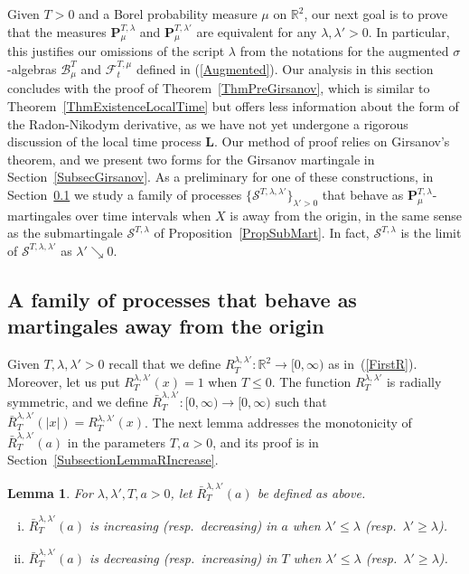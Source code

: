 \documentclass[10pt]{article}
\numberwithin{equation}{section}
\newtheorem{lemma}[theorem]{Lemma}
\theoremstyle{definition}
\newcommand{\R}{{\mathbb R}}
\begin{document}
Given $T>0$ and a  Borel probability measure $\mu$ on $\R^2$, our next goal is to prove that the measures $\mathbf{P}^{T,\lambda}_{\mu}$ and $\mathbf{P}^{T,\lambda'}_{\mu}$ are equivalent for any $\lambda,\lambda' >0$. In particular, this justifies our omissions of the script $\lambda$ from the notations for the augmented $\sigma$-algebras $\mathscr{B}^T_{\mu}$ and $\mathscr{F}^{T,\mu}_t$ defined in (\ref{Augmented}). Our analysis in this section concludes with the proof of Theorem~\ref{ThmPreGirsanov}, which is similar to Theorem~\ref{ThmExistenceLocalTime} but offers less information about the form of the Radon-Nikodym derivative, as we have not yet undergone  a  rigorous discussion of the local time process $\mathbf{L}$. Our method of proof relies on Girsanov's theorem, and we present two forms for  the Girsanov martingale in Section~\ref{SubsecGirsanov}.  As a preliminary for one of these constructions, in Section~\ref{SubsectMartFamily} we study a family of processes $\{\mathcal{S}^{T,\lambda,\lambda'}\}_{\lambda'>0  }$ that behave as $\mathbf{P}^{T,\lambda}_{\mu}$-martingales  over time intervals when $X$ is away from the origin, in the same sense as the submartingale $\mathcal{S}^{T,\lambda}$ of Proposition~\ref{PropSubMart}.  In fact, $\mathcal{S}^{T,\lambda}$ is the limit of $\mathcal{S}^{T,\lambda,\lambda'}$ as $\lambda'\searrow 0$. 





\subsection{A family of processes that behave as martingales away from the origin}\label{SubsectMartFamily}

 Given $T,\lambda,\lambda'>0$ recall that we define $R^{\lambda,\lambda'}_{T}:\R^2\rightarrow [0,\infty)$ as in~(\ref{FirstR}).
Moreover, let us put $R^{\lambda,\lambda'}_{T}(x)=1$ when $T\leq 0$.  The function $R^{\lambda,\lambda'}_{T}$ is radially symmetric, and we define $ \bar{R}^{\lambda,\lambda'}_{T}: [0,\infty)\rightarrow [0,\infty) $ such that $\bar{R}^{\lambda,\lambda'}_{T}(|x|)= R^{\lambda,\lambda'}_{T}(x) $.  The next lemma addresses the monotonicity of $\bar{R}^{\lambda,\lambda'}_{T}(a)$ in the parameters $T,a>0$, and its  proof  is in Section~\ref{SubsectionLemmaRIncrease}.
\begin{lemma}\label{LemmaRIncrease} For $\lambda,\lambda',T,a>0$, let $\bar{R}^{\lambda,\lambda'}_{T}(a)$ be defined as above.
\begin{enumerate}[(i)]

    \item $\bar{R}^{\lambda,\lambda'}_{T}(a)$ is  increasing (resp.\ decreasing) in $a$ when $\lambda'\leq \lambda$ (resp.\ $\lambda'\geq \lambda$).

     \item $ \bar{R}^{\lambda,\lambda'}_{T}(a)$   is decreasing (resp.\ increasing) in $T$ when $\lambda'\leq \lambda$ (resp.\ $\lambda'\geq \lambda$).
\end{enumerate}
\end{lemma}
\end{document}
